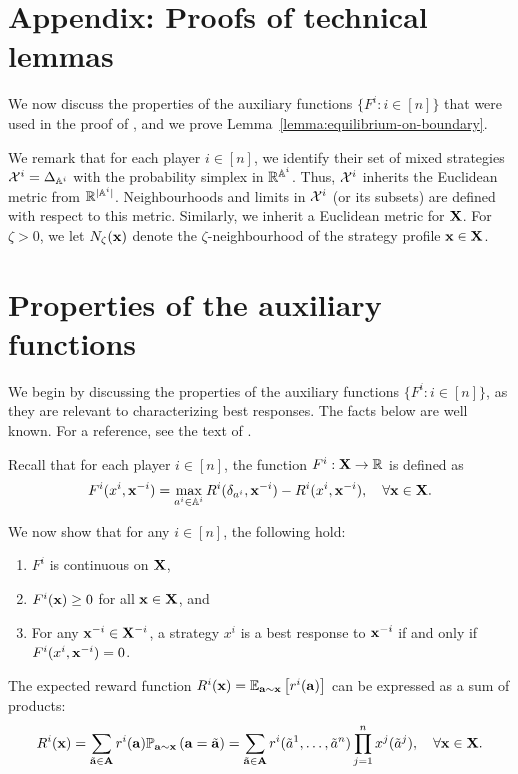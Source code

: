 
\section*{Appendix: Proofs of technical lemmas}  \label{appendix}

We now discuss the properties of the auxiliary functions $\{ F^i : i \in[n]\}$ that were used in the proof of , and we prove Lemma~\ref{lemma:equilibrium-on-boundary}. 

We remark that for each player $i \in [n]$, we identify their set of mixed strategies $\mathcal{X}^i = \Delta_{\mathbb{A}^i}$ with the probability simplex in $\mathbb{R}^{\mathbb{A}^i}$. Thus, $\mathcal{X}^i$ inherits the Euclidean metric from $\mathbb{R}^{| \mathbb{A}^i |}$. Neighbourhoods and limits in $\mathcal{X}^i$ (or its subsets) are defined with respect to this metric. Similarly, we inherit a Euclidean metric for ${\mathbf{X}}$. For $\zeta > 0$, we let $N_{\zeta} ( {\mathbf{x}} )$ denote the $\zeta$-neighbourhood of the strategy profile ${\mathbf{x}} \in {\mathbf{X}}$. 


 
\section{Properties of the auxiliary functions} \label{appendix:F-functions}

 We begin by discussing the properties of the auxiliary functions $\{ F^i : i \in [n] \}$, as they are relevant to characterizing best responses. The facts below are well known. For a reference, see the text of \cite{maschler2020game}.
 
Recall that for each player $i\in[n]$, the function $F^i : {\mathbf{X}} \to \mathbb{R}$ is defined as
\[
F^i ( x^i, {\mathbf{x}}^{-i} ) = \max_{a^i \in \mathbb{A}^i} R^i ( \delta_{a^i} , {\mathbf{x}}^{-i} ) - R^i ( x^i, {\mathbf{x}}^{-i} ), \quad \forall {\mathbf{x}} \in {\mathbf{X}} .
\]

We now show that for any $i \in [n]$, the following hold: 
\begin{enumerate}[label=\alph*.]
    \item $F^i$ is continuous on ${\mathbf{X}}$,
    \item $F^i ({\mathbf{x}}) \geq 0$ for all ${\mathbf{x}} \in {\mathbf{X}}$, and
    \item For any ${\mathbf{x}}^{-i} \in {\mathbf{X}}^{-i}$, a strategy $x^i$ is a best response to ${\mathbf{x}}^{-i}$ if and only if $F^i (x^i, {\mathbf{x}}^{-i}) = 0$.
\end{enumerate}

The expected reward function $R^i( {\mathbf{x}}) = \mathbb{E}_{{\mathbf{a}} \sim {\mathbf{x}} } \left[ r^i ( {\mathbf{a}}) \right]$ can be expressed as a sum of products:
\[
R^i( {\mathbf{x}}) = \sum_{ \tilde{{\mathbf{a}}} \in {\mathbf{A}} } r^i ( {\mathbf{a}} ) \mathbb{P}_{{\mathbf{a}} \sim {\mathbf{x}} } \left( {\mathbf{a}} = \tilde{{\mathbf{a}}}  \right)
= \sum_{\tilde{{\mathbf{a}}} \in {\mathbf{A}}} r^i ( \tilde{a}^1, \dots, \tilde{a}^n ) \prod_{j =1}^n x^j ( \tilde{a}^j ), \quad \forall {\mathbf{x}} \in {\mathbf{X}} .
\]

